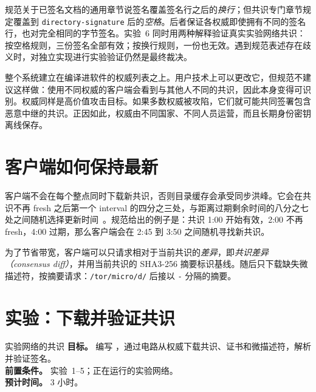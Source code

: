 \begin{approfondimento}
规范关于已签名文档的通用章节说签名覆盖签名行之后的\emph{换行}；但共识专门章节规定覆盖到 \texttt{directory-signature} 后的\emph{空格}。后者保证各权威即使拥有不同的签名行，也对完全相同的字节签名。实验~6 同时用两种解释验证真实实验网络共识：按空格规则，三份签名全部有效；按换行规则，一份也无效。遇到规范表述存在歧义时，对独立实现进行实验验证仍然是最终裁决。
\end{approfondimento}

\begin{attenzione}[权威列表是信任锚]
整个系统建立在编译进软件的权威列表之上。用户技术上可以更改它，但规范不建议这样做：使用不同权威的客户端会看到与其他人不同的共识，因此本身变得可识别。权威同样是高价值攻击目标。如果多数权威被攻陷，它们就可能共同签署包含恶意中继的共识。正因如此，权威由不同国家、不同人员运营，而且长期身份密钥离线保存。
\end{attenzione}

\section{客户端如何保持最新}\label{sec:dir-client}

客户端不会在每个整点同时下载新共识，否则目录缓存会承受同步洪峰。它会在共识不再 fresh 之后第一个 interval 的四分之三处，与距离过期剩余时间的八分之七处之间随机选择更新时间~。规范给出的例子是：共识 1:00 开始有效，2:00 不再 fresh，4:00 过期，那么客户端会在 2:45 到 3:50 之间随机寻找新共识。

为了节省带宽，客户端可以只请求相对于当前共识的\emph{差异}，即\emph{共识差异（consensus diff）}，并用当前共识的 SHA3-256 摘要标识基线。随后只下载缺失微描述符，按摘要请求：\nolinkurl{/tor/micro/d/} 后接以 \texttt{-} 分隔的摘要。

\section{实验：下载并验证共识}\label{sec:lab-directory}

\begin{laboratorio}[6]{实验网络的共识}
\textbf{目标。} 编写 ，通过电路从权威下载共识、证书和微描述符，解析并验证签名。\\
\textbf{前置条件。} 实验~1--5；正在运行的实验网络。\\
\textbf{预计时间。} 3 小时。
\end{laboratorio}

